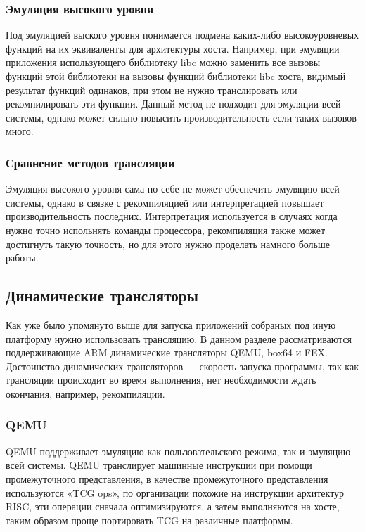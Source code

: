 \subsubsection{Эмуляция высокого уровня}

Под эмуляцией выского уровня понимается подмена каких-либо высокоуровневых функций на их эквиваленты для архитектуры хоста. Например, при эмуляции приложения использующего библиотеку libc можно заменить все вызовы функций этой библиотеки на вызовы функций библиотеки libc хоста, видимый результат функций одинаков, при этом не нужно транслировать или рекомпилировать эти функции. Данный метод не подходит для эмуляции всей системы, однако может сильно повысить производительность если таких вызовов много.

\subsubsection{Сравнение методов трансляции}

Эмуляция высокого уровня сама по себе не может обеспечить эмуляцию всей системы, однако в связке с рекомпиляцией или интерпретацией повышает производительность последних. Интерпретация используется в случаях когда нужно точно испольнять команды процессора, рекомпиляция также может достигнуть такую точность, но для этого нужно проделать намного больше работы.

\subsection{Динамические трансляторы}

Как уже было упомянуто выше для запуска приложений собраных под иную платформу нужно использовать трансляцию. В данном разделе рассматриваются поддерживающие ARM динамические трансляторы QEMU, box64 и FEX. Достоинство динамических трансляторов --- скорость запуска программы, так как трансляции происходит во время выполнения, нет необходимости ждать окончания, например, рекомпиляции.

\subsubsection{QEMU}

QEMU поддерживает эмуляцию как пользовательского режима, так и эмуляцию всей системы. QEMU транслирует машинные инструкции при помощи промежуточного представления, в качестве промежуточного представления используются «TCG ops», по организации похожие на инструкции архитектур RISC, эти операции сначала оптимизируются, а затем выполняются на хосте, таким образом проще портировать TCG на различные платформы. \cite{qemu_readme}

